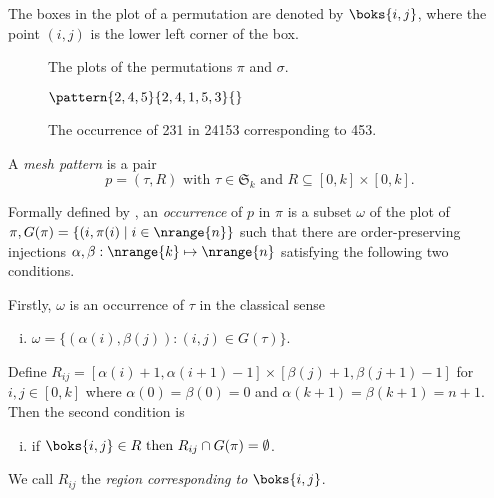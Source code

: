 The boxes in the plot of a permutation are denoted by \(\boks{i,j}\), where the point \((i,j)\) is
the lower left corner of the box.

\begin{figure}[htb]
    \begin{center}
    \raisebox{6ex}{\(G(\pi)=\)}

        \caption{The plots of the permutations \(\pi\) and \(\sigma\).}
        \label{fig:plots}
    \end{center}
\end{figure}

\begin{figure}[htb]
    \begin{center}
    \(\pattern{2,4,5}{2,4,1,5,3}{}\)
        \caption{The occurrence of 231 in 24153 corresponding to 453.}
        \label{fig:containment}
    \end{center}
\end{figure}

\begin{definition}
A \emph{mesh pattern} is a pair
\begin{equation*}
    p = (\tau,R)\text{ with } \tau \in \mathfrak{S}_k \text{ and } R \subseteq [0,k]\times [0,k].
\end{equation*}
\end{definition}

Formally defined by \textcite{journals/combinatorics/BrandenC11},
an \emph{occurrence} of \(p\) in \(\pi\) is a subset \(\omega\) of the plot of
\(\pi, G(\pi) = \{(i,\pi(i)\mid i\in\nrange{n}\}\) such that there are order-preserving
injections \(\alpha,\beta:\nrange{k}\mapsto\nrange{n}\) satisfying the following two conditions.

\noindent Firstly, \(\omega\) is an occurrence of \(\tau\) in the classical sense
  \begin{enumerate}[i.]
    \item \(\omega = \{(\alpha(i),\beta(j)):(i,j)\in G(\tau)\}\).
  \end{enumerate}\saveenum
  Define \(R_{ij} = [\alpha(i)+1,\alpha(i+1)-1]\times[\beta(j)+1,\beta(j+1)-1]\)
   for \(i,j\in[0,k]\) where \(\alpha(0)=\beta(0)=0\) and \(\alpha(k+1)=\beta(k+1)=n+1\). Then
   the second condition is
  \begin{enumerate}[i.]\resetenum
  \item if \(\boks{i,j} \in R \text{ then } R_{ij} \cap G(\pi) = \emptyset\).
\end{enumerate}
We call \(R_{ij}\) the \emph{region corresponding to} \(\boks{i,j}\).

